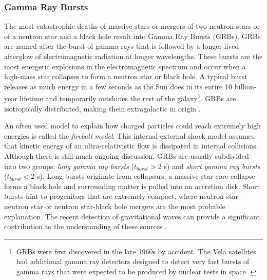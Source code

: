 \subsubsection{Gamma Ray Bursts}
\label{subsubsec:grb}
The most catastrophic deaths of massive stars or mergers of two neutron stars or of a neutron star and a black hole result into Gamma Ray Bursts (GRBs). GRBs are named after the burst of gamma rays that is followed by a longer-lived afterglow of electromagnetic radiation at longer wavelengths. These bursts are the most energetic explosions in the electromagnetic spectrum and occur when a high-mass star collapses to form a neutron star or black hole. A typical burst releases as much energy in a few seconds as the Sun does in its entire 10 billion-year lifetime and temporarily outshines the rest of the galaxy\footnote{GRBs were first discovered in the late 1960s by accident. The Vela satellites had additional gamma ray detectors designed to detect very fast bursts of gamma rays that were expected to be produced by nuclear tests in space \cite{Klebesadel:1973iq}.}. GRBs are isotropically distributed, making them extragalactic in origin \cite{Meegan:1992xg}.

An often used model to explain how charged particles could reach extremely high energies is called the \textit{fireball model}. This internal-external shock model assumes that kinetic energy of an ultra-relativistic flow is dissipated in internal collisions. \\

\noindent Although there is still much ongoing discussion, GRBs are usually subdivided into two groups: \textit{long gamma ray bursts} ($t_{burst} > 2$ s) and \textit{short gamma ray bursts} ($t_{burst} < 2$ s). Long bursts originate from collapsars: a massive star core-collapse forms a black hole and surrounding matter is pulled into an accretion disk. Short bursts hint to progenitors that are extremely compact, where neutron star-neutron star or neutron star-black hole mergers are the most probable explanation. The recent detection of gravitational waves can provide a significant contribution to the understanding of these sources \cite{TheLIGOScientific:2017qsa,Abbott:2017oio,Abbott:2017gyy,Abbott:2017vtc,Abbott:2016nmj}.

